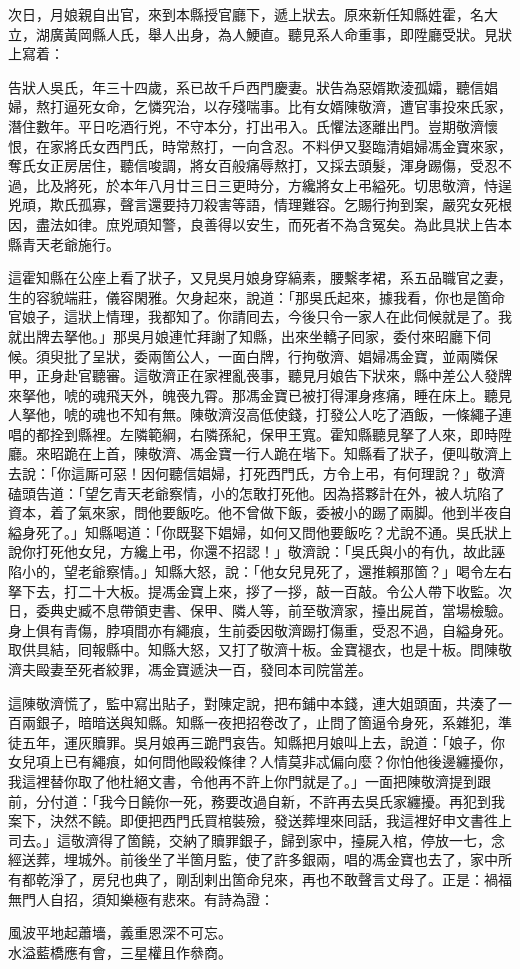 次日，月娘親自出官，來到本縣授官廳下，遞上狀去。原來新任知縣姓霍，名大立，湖廣黃岡縣人氏，舉人出身，為人鯁直。聽見系人命重事，即陞廳受狀。見狀上寫着：

\begin{myquote}[\markfont]
告狀人吳氏，年三十四歲，系已故千戶西門慶妻。狀告為惡婿欺淩孤孀，聽信娼婦，熬打逼死女命，乞憐究治，以存殘喘事。比有女婿陳敬濟，遭官事投來氏家，潛住數年。平日吃酒行兇，不守本分，打出弔入。氏懼法逐離出門。豈期敬濟懷恨，在家將氏女西門氏，時常熬打，一向含忍。不料伊又娶臨清娼婦馮金寶來家，奪氏女正房居住，聽信唆調，將女百般痛辱熬打，又採去頭髮，渾身踢傷，受忍不過，比及將死，於本年八月廿三日三更時分，方纔將女上弔縊死。切思敬濟，恃逞兇頑，欺氏孤寡，聲言還要持刀殺害等語，情理難容。{}乞賜行拘到案，嚴究女死根因，盡法如律。庶兇頑知警，良善得以安生，而死者不為含冤矣。為此具狀上告本縣青天老爺施行。
\end{myquote}

這霍知縣在公座上看了狀子，又見吳月娘身穿縞素，腰繫孝裙，系五品職官之妻，生的容貌端莊，儀容閑雅。欠身起來，說道：「那吳氏起來，據我看，你也是箇命官娘子，這狀上情理，我都知了。你請囘去，今後只令一家人在此伺候就是了。我就出牌去拏他。」那吳月娘連忙拜謝了知縣，出來坐轎子囘家，委付來昭廳下伺候。須臾批了呈狀，委兩箇公人，一面白牌，行拘敬濟、娼婦馮金寶，並兩隣保甲，正身赴官聽審。這敬濟正在家裡亂䘮事，聽見月娘告下狀來，縣中差公人發牌來拏他，唬的魂飛天外，魄䘮九霄。那馮金寶已被打得渾身疼痛，睡在床上。聽見人拏他，唬的魂也不知有無。陳敬濟沒高低使錢，打發公人吃了酒飯，一條繩子連唱的都拴到縣裡。左隣範綱，右隣孫紀，保甲王寬。霍知縣聽見拏了人來，即時陞廳。來昭跪在上首，陳敬濟、馮金寶一行人跪在堦下。知縣看了狀子，便叫敬濟上去說：「你這厮可惡！因何聽信娼婦，打死西門氏，方令上弔，有何理說？」敬濟磕頭告道：「望乞青天老爺察情，小的怎敢打死他。因為搭夥計在外，被人坑陷了資本，着了氣來家，問他要飯吃。他不曾做下飯，委被小的踢了兩脚。他到半夜自縊身死了。」知縣喝道：「你既娶下娼婦，如何又問他要飯吃？尤說不通。吳氏狀上說你打死他女兒，方纔上弔，你還不招認！」敬濟說：「吳氏與小的有仇，故此誣陷小的，望老爺察情。」知縣大怒，說：「他女兒見死了，還推賴那箇？」喝令左右拏下去，打二十大板。提馮金寶上來，拶了一拶，敲一百敲。令公人帶下收監。次日，委典史臧不息帶領吏書、保甲、隣人等，前至敬濟家，擡出屍首，當場檢驗。身上俱有青傷，脖項間亦有繩痕，生前委因敬濟踢打傷重，受忍不過，自縊身死。{}取供具結，囘報縣中。知縣大怒，又打了敬濟十板。金寶褪衣，也是十板。問陳敬濟夫毆妻至死者絞罪，馮金寶遞決一百，發囘本司院當差。

這陳敬濟慌了，監中寫出貼子，對陳定說，把布鋪中本錢，連大姐頭面，共湊了一百兩銀子，暗暗送與知縣。知縣一夜把招卷改了，{}止問了箇逼令身死，系雜犯，準徒五年，運灰贖罪。吳月娘再三跪門哀告。知縣把月娘叫上去，說道：「娘子，你女兒項上已有繩痕，如何問他毆殺條律？人情莫非忒偏向麼？你怕他後邊纏擾你，我這裡替你取了他杜絕文書，令他再不許上你門就是了。」{}一面把陳敬濟提到跟前，分付道：「我今日饒你一死，務要改過自新，不許再去吳氏家纏擾。再犯到我案下，決然不饒。即便把西門氏買棺裝殮，發送葬埋來囘話，我這裡好申文書徃上司去。」這敬濟得了箇饒，交納了贖罪銀子，歸到家中，擡屍入棺，停放一七，念經送葬，埋城外。前後坐了半箇月監，使了許多銀兩，唱的馮金寶也去了，家中所有都乾淨了，房兒也典了，剛刮剌出箇命兒來，再也不敢聲言丈母了。正是：禍福無門人自招，須知樂極有悲來。有詩為證：

\begin{myquote}
風波平地起蕭墻，義重恩深不可忘。\\水溢藍橋應有會，三星權且作叅商。
\end{myquote}
